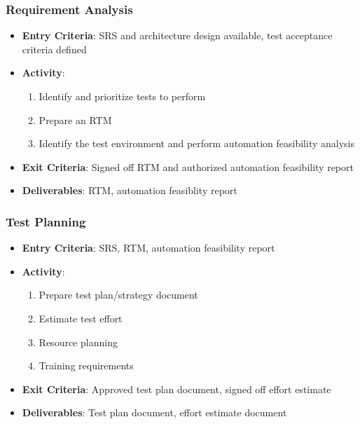 \documentclass{article}
\begin{document}
\subsubsection{Requirement Analysis}
\begin{itemize}
    \item \textbf{Entry Criteria}: SRS and architecture design available, test acceptance criteria defined
    
    \item \textbf{Activity}:
    \begin{enumerate}
        \item Identify and prioritize tests to perform
        
        \item Prepare an RTM
        
        \item Identify the test environment and perform automation feasibility analysis
    \end{enumerate}
    
    \item \textbf{Exit Criteria}: Signed off RTM and authorized automation feasibility report
    
    \item \textbf{Deliverables}: RTM, automation feasiblity report
\end{itemize}

\subsubsection{Test Planning}
\begin{itemize}
    \item \textbf{Entry Criteria}: SRS, RTM, automation feasibility report
    
    \item \textbf{Activity}:
    \begin{enumerate}
        \item Prepare test plan/strategy document
        
        \item Estimate test effort
        
        \item Resource planning
        
        \item Training requirements
    \end{enumerate}
    
    \item \textbf{Exit Criteria}: Approved test plan document, signed off effort estimate 
    
    \item \textbf{Deliverables}: Test plan document, effort estimate document
\end{itemize}
\end{document}
